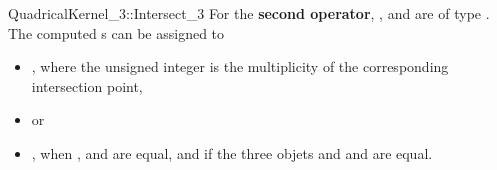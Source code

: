 \begin{ccRefFunctionObjectConcept}{QuadricalKernel_3::Intersect_3}
For the \textbf{second operator}, ,  and 
are of type . 
The computed s can be assigned to 
\begin{itemize}
\item {} ,
where the unsigned integer is the multiplicity of the corresponding
intersection point,
\item {}  or
\item {} , when ,  and  
are equal, and if the three objets  and  and 
are equal.
\end{itemize} 

\end{ccRefFunctionObjectConcept}
